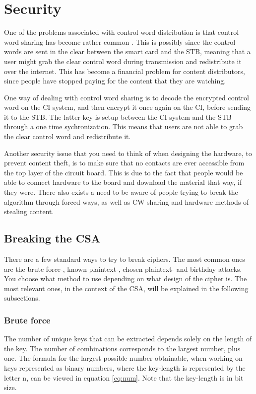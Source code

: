 \section{Security}
One of the problems associated with control word distribution is that 
control word sharing has become rather common \citep{Farncombe}. This 
is possibly since the control words are sent in the clear between the 
smart card and the STB, meaning that a user might grab the clear 
control word during transmission and redistribute it over the internet. 
This has become a financial problem for content distributors, since 
people have stopped paying for the content that they are watching.

One way of dealing with control word sharing is to decode the encrypted 
control word on the CI system, and then encrypt it once again on the CI,
before sending it to the STB. The latter key is setup between the CI 
system and the STB through a one time sychronization. This means that 
users are not able to grab the clear control word and redistribute it. 
\citep[pp. 12--13]{HIS:2011}

Another security issue that you need to think of when designing the 
hardware, to prevent content theft, is to make sure that no contacts 
are ever accessible from the top layer of the circuit board. This is 
due to the fact that people would be able to connect hardware to the 
board and download the material that way, if they were. 
There also exists a need to be aware of people trying to break the 
algorithm through forced ways, as well as CW sharing and hardware 
methods of stealing content.

\subsection{Breaking the CSA}
There are a few standard ways to try to break ciphers. The most common 
ones are the brute force-, known plaintext-, chosen plaintext- and 
birthday attacks. You choose what method to use depending on what design
of the cipher is. The most relevant ones, in the context of the CSA, 
will be explained in the following subsections. 
\citep[pp. 31-34]{Schneier:2003}

\subsubsection{Brute force}
The number of unique keys that can be extracted depends solely on the 
length of the key. The number of combinations corresponds to the 
largest number, plus one. The formula for the largest possible number 
obtainable, when working on keys represented as binary numbers, where 
the key-length is represented by the letter n, can be viewed in equation
\ref{eq:num}. Note that the key-length is in bit size.

